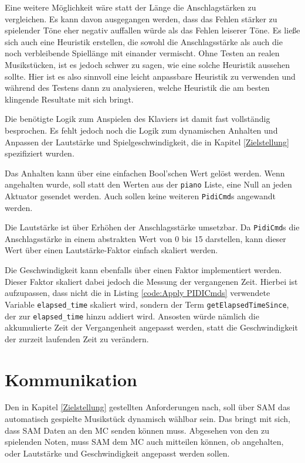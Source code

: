 Eine weitere Möglichkeit wäre statt der Länge die Anschlagstärken zu vergleichen.
Es kann davon ausgegangen werden, dass das Fehlen stärker zu spielender Töne eher negativ auffallen würde als das Fehlen leiserer Töne.
Es ließe sich auch eine Heuristik erstellen, die sowohl die Anschlagsstärke als auch die noch verbleibende Spiellänge mit einander vermischt.
Ohne Testen an realen Musikstücken, ist es jedoch schwer zu sagen, wie eine solche Heuristik aussehen sollte.
Hier ist es also sinnvoll eine leicht anpassbare Heuristik zu verwenden und während des Testens dann zu analysieren, welche Heuristik die am besten klingende Resultate mit sich bringt.

Die benötigte Logik zum Anspielen des Klaviers ist damit fast vollständig besprochen.
Es fehlt jedoch noch die Logik zum dynamischen Anhalten und Anpassen der Lautstärke und Spielgeschwindigkeit, die in Kapitel \ref{Zielstellung} spezifiziert wurden.

Das Anhalten kann über eine einfachen Bool'schen Wert gelöst werden.
Wenn angehalten wurde, soll statt den Werten aus der \lstinline{piano} Liste, eine Null an jeden Aktuator gesendet werden.
Auch sollen keine weiteren \lstinline{PidiCmd}s angewandt werden.

Die Lautstärke ist über Erhöhen der Anschlagsstärke umsetzbar.
Da \lstinline{PidiCmd}s die Anschlagsstärke in einem abstrakten Wert von 0 bis 15 darstellen, kann dieser Wert über einen Lautstärke-Faktor einfach skaliert werden.

Die Geschwindigkeit kann ebenfalls über einen Faktor implementiert werden.
Dieser Faktor skaliert dabei jedoch die Messung der vergangenen Zeit.
Hierbei ist aufzupassen, dass nicht die in Listing \ref{code:Apply PIDICmds} verwendete Variable \lstinline{elapsed_time} skaliert wird, sondern der Term \lstinline{getElapsedTimeSince}, der zur \lstinline{elapsed_time} hinzu addiert wird.
Ansosten würde nämlich die akkumulierte Zeit der Vergangenheit angepasst werden, statt die Geschwindigkeit der zurzeit laufenden Zeit zu verändern.


\section{Kommunikation} \label{vorgehenSW-SPPP}

Den in Kapitel \ref{Zielstellung} gestellten Anforderungen nach, soll über \ac{SAM} das automatisch gespielte Musikstück dynamisch wählbar sein.
Das bringt mit sich, dass \ac{SAM} Daten an den \ac{MC} senden können muss.
Abgesehen von den zu spielenden Noten, muss \ac{SAM} dem \ac{MC} auch mitteilen können, ob angehalten, oder Lautstärke und Geschwindigkeit angepasst werden sollen.

